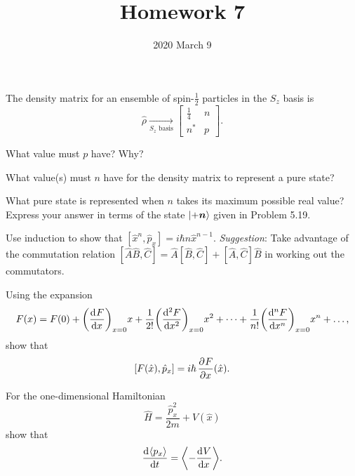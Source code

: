 \documentclass{../phys116}
\title{Homework 7}
\author{}
\date{2020 March 9}
\begin{document}
\begin{exercise}
  The density matrix for an ensemble of spin-\(\frac 1 2\) particles
  in the \(S_z\) basis is
  \[
    \hat \rho \xrightarrow[\text{\(S_z\) basis}]{}
    \begin{bmatrix} \frac 1 4  & n \\ n^* & p \end{bmatrix}.
  \]
  \begin{problems}
  \item What value must \(p\) have?  Why?
  \item What value(s) must \(n\) have for the density matrix to
    represent a pure state?
  \item What pure state is represented when \(n\) takes its maximum
    possible real value?  Express your answer in terms of the state
    \(\ket{+\vec n}\) given in Problem 5.19.
  \end{problems}
\end{exercise}

\begin{solution}
  \begin{problems}
  \item
  \item
  \item
  \end{problems}
\end{solution}

\begin{exercise}
  \begin{problems}
  \item Use induction to show that
    \([\hat x^n, \hat p_x] = i \hbar n \hat x^{n-1}\).
    \textit{Suggestion}: Take advantage of the commutation relation
    \([\hat A \hat B, \hat C] = \hat A [\hat B, \hat C] + [\hat A,
    \hat C] \hat B\) in working out the commutators.
  \item Using the expansion
    \[
      F(x)
      = F(0)
      + \prn*{\drv F x}_{x=0} x
      + \frac{1}{2!} \prn*{\drv[2] F x}_{x=0} x^2 + \dots
      + \frac{1}{n!} \prn*{\drv[n] F x}_{x=0} x^n + \dots,
    \]
    show that
    \[
      [F(\hat x), \hat p_x] = i \hbar \, \frac{\mathop{}\!\partial^{} F}{\mathop{}\!\partial x^{}} (\hat x).
    \]
  \item For the one-dimensional Hamiltonian
    \[
      \hat H = \frac{\hat p_x^2}{2m} + V(\hat x)
    \]
    show that
    \[
      \drv{\abr{p_x}}{t} = \abr*{-\drv V x}.
    \]
  \end{problems}
\end{exercise}
\end{document}
